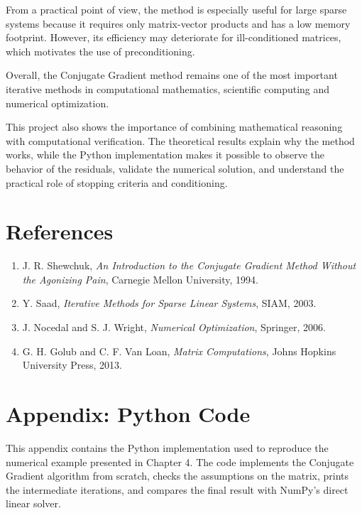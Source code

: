 \documentclass[11pt,a4paper]{report}
\theoremstyle{definition}
\theoremstyle{plain}
\theoremstyle{remark}
\begin{document}
From a practical point of view, the method is especially useful for large sparse systems because it requires only matrix-vector products and has a low memory footprint. However, its efficiency may deteriorate for ill-conditioned matrices, which motivates the use of preconditioning.

Overall, the Conjugate Gradient method remains one of the most important iterative methods in computational mathematics, scientific computing and numerical optimization.

This project also shows the importance of combining mathematical reasoning with computational verification. The theoretical results explain why the method works, while the Python implementation makes it possible to observe the behavior of the residuals, validate the numerical solution, and understand the practical role of stopping criteria and conditioning.

\chapter*{\centering\color{bleufonce}References}

\begin{enumerate}
    \item J. R. Shewchuk, \textit{An Introduction to the Conjugate Gradient Method Without the Agonizing Pain}, Carnegie Mellon University, 1994.
    \item Y. Saad, \textit{Iterative Methods for Sparse Linear Systems}, SIAM, 2003.
    \item J. Nocedal and S. J. Wright, \textit{Numerical Optimization}, Springer, 2006.
    \item G. H. Golub and C. F. Van Loan, \textit{Matrix Computations}, Johns Hopkins University Press, 2013.
\end{enumerate}

\appendix

\chapter*{\centering\color{bleufonce}Appendix: Python Code}
\label{appendix:python}

This appendix contains the Python implementation used to reproduce the numerical example presented in Chapter 4. The code implements the Conjugate Gradient algorithm from scratch, checks the assumptions on the matrix, prints the intermediate iterations, and compares the final result with NumPy's direct linear solver.
\end{document}
